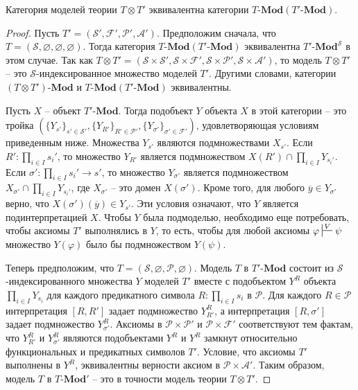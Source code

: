 \documentclass[reqno]{amsart}
\theoremstyle{definition}
\theoremstyle{remark}
\newcommand{\bcat}[1]{\mathbf{#1}}
\newcommand{\Mod}[1]{#1\text{-}\bcat{Mod}}
\begin{document}
\begin{prop}
Категория моделей теории $T \otimes T'$ эквивалентна категории $\Mod{T}(\Mod{T'})$.
\end{prop}
\begin{proof}
Пусть $T' = (\mathcal{S}',\mathcal{F}',\mathcal{P}',\mathcal{A}')$.
Предположим сначала, что $T = (\mathcal{S},\varnothing,\varnothing,\varnothing)$.
Тогда категория $\Mod{T}(\Mod{T'})$ эквивалентна $\Mod{T'}^\mathcal{S}$ в этом случае.
Так как $T \otimes T' = (\mathcal{S} \times \mathcal{S}', \mathcal{S} \times \mathcal{F}', \mathcal{S} \times \mathcal{P}', \mathcal{S} \times \mathcal{A}')$, то модель $T \otimes T'$ -- это $\mathcal{S}$-индексированное множество моделей $T'$.
Другими словами, категории $\Mod{(T \otimes T')}$ и $\Mod{T}(\Mod{T'})$ эквивалентны.

Пусть $X$ -- объект $\Mod{T'}$.
Тогда подобъект $Y$ объекта $X$ в этой категории -- это тройка $(\{ Y_{s'} \}_{s' \in \mathcal{S}'}, \{ Y_{R'} \}_{R' \in \mathcal{P}'}, \{ Y_{\sigma'} \}_{\sigma' \in \mathcal{F}'})$, удовлетворяющая условиям приведенным ниже.
Множества $Y_{s'}$ являются подмножествами $X_{s'}$.
Если $R' : \prod_{i \in I} s_i'$, то множество $Y_{R'}$ является подмножеством $X(R') \cap \prod_{i \in I} Y_{s_i'}$.
Если $\sigma' : \prod_{i \in I} s_i' \to s'$, то множество $Y_{\sigma'}$ является подмножеством $X_{\sigma'} \cap \prod_{i \in I} Y_{s_i'}$, где $X_{\sigma'}$ -- это домен $X(\sigma')$.
Кроме того, для любого $\overline{y} \in Y_{\sigma'}$ верно, что $X(\sigma')(\overline{y}) \in Y_{s'}$.
Эти условия означают, что $Y$ является подинтерпретацией $X$.
Чтобы $Y$ была подмоделью, необходимо еще потребовать, чтобы аксиомы $T'$ выполнялись в $Y$, то есть, чтобы для любой аксиомы $\varphi \sststile{}{V} \psi$ множество $Y(\varphi)$ было бы подмножеством $Y(\psi)$.

Теперь предположим, что $T = (\mathcal{S},\varnothing,\mathcal{P},\varnothing)$.
Модель $T$ в $\Mod{T'}$ состоит из $\mathcal{S}$-индексированного множества $Y$ моделей $T'$ вместе с подобъектом $Y^R$ объекта $\prod_{i \in I} Y_{s_i}$ для каждого предикатного символа $R : \prod_{i \in I} s_i$ в $\mathcal{P}$.
Для каждого $R \in \mathcal{P}$ интерпретация $[R,R']$ задает подмножество $Y^R_{R'}$, а интерпретация $[R,\sigma']$ задает подмножество $Y^R_{\sigma'}$.
Аксиомы в $\mathcal{P} \times \mathcal{P}'$ и $\mathcal{P} \times \mathcal{F}'$ соответствуют тем фактам, что $Y^R_{R'}$ и $Y^R_{\sigma'}$ являются подобъектами $Y^R$ и $Y^R$ замкнут относительно функциональных и предикатных символов $T'$.
Условие, что аксиомы $T'$ выполнены в $Y^R$, эквивалентны верности аксиом в $\mathcal{P} \times \mathcal{A}'$.
Таким образом, модель $T$ в $\Mod{T}'$ -- это в точности модель теории $T \otimes T'$.


\end{proof}
\end{document}

